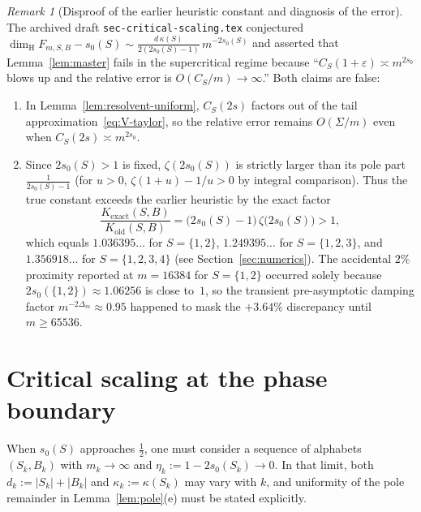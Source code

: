 \documentclass[11pt]{article}
\theoremstyle{definition}
\theoremstyle{remark}
\newtheorem{remark}[theorem]{Remark}
\newcommand{\dimH}{\dim_{\mathrm{H}}}
\begin{document}
\begin{remark}[Disproof of the earlier heuristic constant and diagnosis of the error]\label{rem:old-supercritical-disproved}
The archived draft \texttt{sec-critical-scaling.tex} conjectured
$\dimH F_{m,S,B}-s_0(S)\sim\frac{d\,\kappa(S)}{2(2s_0(S)-1)}\,m^{-2s_0(S)}$
and asserted that Lemma~\ref{lem:master} fails in the supercritical regime
because ``$C_S(1+\varepsilon)\asymp m^{2s_0}$ blows up and the relative error
is $O(C_S/m)\to\infty$.'' Both claims are false:
\begin{enumerate}[label=\textup{(\roman*)},leftmargin=2.2em]
\item In Lemma~\ref{lem:resolvent-uniform}, $C_S(2s)$ factors out of the tail
approximation~\eqref{eq:V-taylor}, so the relative error remains $O(\Sigma/m)$
even when $C_S(2s)\asymp m^{2s_0}$.
\item Since $2s_0(S)>1$ is fixed, $\zeta(2s_0(S))$ is strictly larger than
its pole part $\frac{1}{2s_0(S)-1}$ (for $u>0$, $\zeta(1+u)-1/u>0$ by
integral comparison). Thus the true constant exceeds the earlier heuristic by
the exact factor
\[
\frac{K_{\mathrm{exact}}(S,B)}{K_{\mathrm{old}}(S,B)}
=\bigl(2s_0(S)-1\bigr)\,\zeta\bigl(2s_0(S)\bigr)>1,
\]
which equals $1.036395\dots$ for $S=\{1,2\}$, $1.249395\dots$ for
$S=\{1,2,3\}$, and $1.356918\dots$ for $S=\{1,2,3,4\}$ (see
Section~\ref{sec:numerics}). The accidental $2\%$ proximity reported at
$m=16384$ for $S=\{1,2\}$ occurred solely because $2s_0(\{1,2\})\approx 1.06256$
is close to~$1$, so the transient pre-asymptotic damping factor
$m^{-2\Delta_m}\approx 0.95$ happened to mask the $+3.64\%$ discrepancy until
$m\ge 65536$.
\end{enumerate}
\end{remark}

\section{Critical scaling at the phase boundary}\label{sec:critical}

When $s_0(S)$ approaches $\frac12$, one must consider a sequence of alphabets
$(S_k,B_k)$ with $m_k\to\infty$ and $\eta_k:=1-2s_0(S_k)\to0$. In that limit,
both $d_k:=|S_k|+|B_k|$ and $\kappa_k:=\kappa(S_k)$ may vary with $k$, and
uniformity of the pole remainder in Lemma~\ref{lem:pole}(e) must be stated
explicitly.
\end{document}
